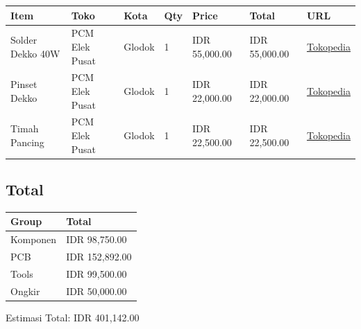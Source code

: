 \documentclass[a4paper,12pt,oneside,pdflatex,italian,final,twocolumn]{article}
\begin{document}
	\begin{table}[!ht]
		\centering
		\begin{tabular}{|l|l|l|l|l|l|l|}
			\hline
			Item & Toko & Kota & Qty & Price & Total & URL \\ \hline
			Solder Dekko 40W & PCM Elek Pusat & Glodok & 1 & IDR 55,000.00 & IDR 55,000.00 & \href{https://www.tokopedia.com/pcmelektronik/soldering-solder-iron-dekko-deko-40w-40-watr}{Tokopedia} \\ \hline
			Pinset Dekko & PCM Elek Pusat & Glodok & 1 & IDR 22,000.00 & IDR 22,000.00 & \href{https://www.tokopedia.com/pcmelektronik/pinset-dekko-tekuk-bagus-ori}{Tokopedia} \\ \hline
			Timah Pancing & PCM Elek Pusat & Glodok & 1 & IDR 22,500.00 & IDR 22,500.00 & \href{https://www.tokopedia.com/pcmelektronik/timah-solder-1-rol-10-meter-merk-pancing}{Tokopedia} \\ \hline
		\end{tabular}
	\end{table}
	
	\subsection{Total}
	
	\begin{table}[!ht]
		\centering
		\begin{tabular}{|l|l|}
			\hline
			Group & Total \\ \hline
			Komponen & IDR 98,750.00 \\ \hline
			PCB & IDR 152,892.00  \\ \hline
			Tools & IDR 99,500.00 \\ \hline
			Ongkir & IDR 50,000.00 \\ \hline
		\end{tabular}
	\end{table}
	
	Estimasi Total: IDR 401,142.00
	
\end{document}
